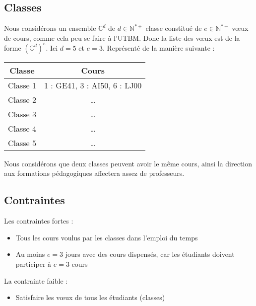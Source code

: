 \subsection{Classes}

Nous considérons un ensemble $\mathbb{C}^d$ de $d \in \mathbb{N}^{*+}$ classe constitué de $e \in \mathbb{N}^{*+}$ v\oe ux de cours, comme cela peu se faire à l'\gls{UTBM}.
Donc la liste des v\oe ux est de la forme $(\mathbb{C}^d)^e$.
Ici $d = 5$ et $e = 3$.
Représenté de la manière suivante :

\begin{center}
    \begin{tabular}{|c|c|}
        \hline
        Classe   & Cours                        \\
        \hline
        Classe 1 & 1 : GE41, 3 : AI50, 6 : LJ00 \\
        \hline
        Classe 2 & \ldots                       \\
        \hline
        Classe 3 & \ldots                       \\
        \hline
        Classe 4 & \ldots                       \\
        \hline
        Classe 5 & \ldots                       \\
        \hline
    \end{tabular}
\end{center}

Nous considérons que deux classes peuvent avoir le même cours, ainsi la direction aux formations pédagogiques affectera assez de professeurs.

\subsection{Contraintes}

Les contraintes fortes :
\begin{itemize}
    \item Tous les cours voulus par les classes dans l'emploi du temps
    \item Au moins $e = 3$ jours avec des cours dispensés, car les étudiants doivent participer à $e = 3$ cours
\end{itemize}

La contrainte faible :
\begin{itemize}
    \item Satisfaire les v\oe ux de tous les étudiants (classes)
\end{itemize}

